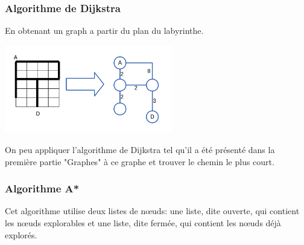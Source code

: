  \subsubsection{Algorithme de Dijkstra}
    En obtenant un graph a partir du plan du labyrinthe.

    \begin{center}
      \includegraphics[width=0.55\textwidth]{../slides/jeux/GRO_graph1.png}
    \end{center}

    On peu appliquer l'algorithme de Dijkstra tel qu'il a été présenté dans la
    première partie "Graphes" à ce graphe et trouver le chemin le plus court.

  \subsubsection{Algorithme A*}
    Cet algorithme utilise deux listes de nœuds: une liste, dite ouverte, qui
    contient les nœuds explorables et une liste, dite fermée, qui contient les
    nœuds déjà explorés.

